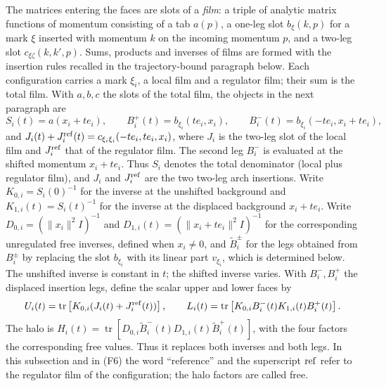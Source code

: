 The matrices entering the faces are slots of a \emph{film}: a triple of
analytic matrix functions of momentum consisting of a tab $a(p)$, a
one-leg slot $b_\xi(k,p)$ for a mark $\xi$ inserted with momentum $k$ on
the incoming momentum $p$, and a two-leg slot $c_{\xi\zeta}(k,k',p)$.
Sums, products and inverses of films are formed with the insertion
rules recalled in the trajectory-bound paragraph below. Each
configuration carries a mark $\xi_i$, a local film and a regulator film;
their sum is the total film. With $a,b,c$ the slots of the total film,
the objects in the next paragraph are
\[
 S_i(t)=a(x_i+te_i),\qquad
 B_i^+(t)=b_{\xi_i}(te_i,x_i),\qquad
 B_i^-(t)=b_{\xi_i}(-te_i,x_i+te_i),
\]
and $J_i(t)+J_i^{\rm ref}(t)=c_{\xi_i\xi_i}(-te_i,te_i,x_i)$, where
$J_i$ is the two-leg slot of the local film and $J_i^{\rm ref}$ that of
the regulator film. The second leg $B_i^-$ is evaluated at the shifted
momentum $x_i+te_i$.
Thus $S_i$ denotes the total denominator (local plus regulator film),
and $J_i$ and $J_i^{\rm ref}$ are the two two-leg arch
insertions. Write $K_{0,i}=S_i(0)^{-1}$ for the inverse at the
unshifted background and $K_{1,i}(t)=S_i(t)^{-1}$ for the inverse at
the displaced background $x_i+t e_i$. Write
$D_{0,i}=(\|x_i\|^2I)^{-1}$ and $D_{1,i}(t)=(\|x_i+te_i\|^2I)^{-1}$ for
the corresponding unregulated free inverses, defined when $x_i\ne0$,
and $\widetilde B_i^\pm$ for the legs obtained from $B_i^\pm$ by
replacing the slot $b_{\xi_i}$ with its linear part $v_{\xi_i}$, which
is determined below. The unshifted inverse is constant
in $t$; the shifted inverse varies. With $B_i^-,B_i^+$ the displaced
insertion legs, define the scalar upper and lower faces by
\begin{equation}
 U_i(t)=\operatorname{tr}\left[K_{0,i}(J_i(t)+J_i^{\rm ref}(t))\right],\qquad
 L_i(t)=\operatorname{tr}\left[K_{0,i}B_i^-(t)K_{1,i}(t)B_i^+(t)\right].
 \label{eq:annulus-fleet-face-estimates-display-F5}
\end{equation}
The halo is $H_i(t)=\operatorname{tr}[D_{0,i}\widetilde B_i^-(t)
D_{1,i}(t)\widetilde B_i^+(t)]$, with the four factors the
corresponding free values. Thus it replaces both inverses and
both legs. In this subsection and in (F6) the word ``reference'' and
the superscript ${\rm ref}$ refer to the regulator film of the
configuration; the halo factors are called free.

